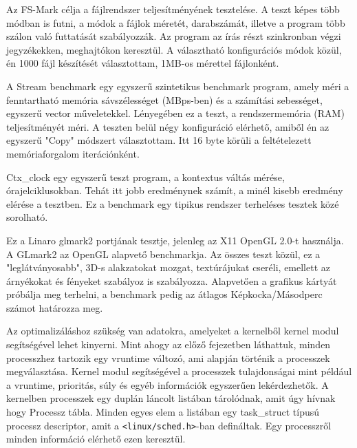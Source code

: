 Az FS-Mark célja a fájlrendszer teljesítményének tesztelése.
A teszt képes több módban is futni, a módok a fájlok méretét, darabszámát, illetve a program több szálon való futtatását szabályozzák. 
Az program az írás részt szinkronban végzi jegyzékekken, meghajtókon keresztül.
A választható konfigurációs módok közül, én 1000 fájl készítését választottam, 1MB-os mérettel fájlonként.

A Stream benchmark egy egyszerű szintetikus benchmark program, amely méri a fenntartható memória sávszélességet (MBps-ben) és a számítási sebességet, egyszerű vector műveletekkel.
Lényegében ez a teszt, a rendszermemória (RAM) teljesítményét méri.
A teszten belül négy konfiguráció elérhető, amiből én az egyszerű  "Copy" módszert választottam.
Itt 16 byte körüli a feltételezett memóriaforgalom iterációnként.

Ctx\_clock egy egyszerű teszt program, a kontextus váltás mérése, órajelciklusokban.
Tehát itt jobb eredménynek számít, a minél kisebb eredmény elérése a tesztben.
Ez a benchmark egy tipikus rendszer terheléses tesztek közé sorolható.

Ez a Linaro glmark2 portjának tesztje, jelenleg az X11 OpenGL 2.0-t használja. A GLmark2 az OpenGL alapvető benchmarkja. Az összes teszt közül, ez a "leglátványosabb", 3D-s alakzatokat mozgat, textúrájukat cseréli, emellett az árnyékokat és fényeket szabályoz is szabályozza.
Alapvetően a grafikus kártyát próbálja meg terhelni, a benchmark pedig az átlagos Képkocka/Másodperc számot határozza meg.


Az optimalizáláshoz szükség van adatokra, amelyeket a kernelből kernel modul segítségével lehet kinyerni. 
Mint ahogy az előző fejezetben láthattuk, minden processzhez tartozik egy vruntime változó, ami alapján történik a processzek megválasztása. 
Kernel modul segítségével a processzek tulajdonságai mint például a vruntime, prioritás, súly és egyéb információk egyszerűen lekérdezhetők.
A kernelben processzek egy duplán láncolt listában tárolódnak, amit úgy hívnak hogy Processz tábla. Minden egyes elem a listában egy task\_struct típusú processz descriptor, amit a \texttt{<linux/sched.h>}-ban defináltak. Egy processzről minden információ elérhető ezen keresztül.

